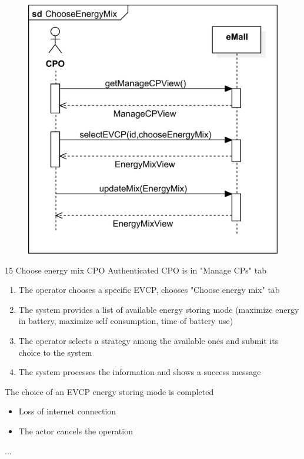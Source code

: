 \usecase
{
    \begin{figure}[H]
        \centering
        \includegraphics[scale=0.9]{src/sequence_diagram/chooseEnergyMix.png}
    \end{figure}
}
{15}
{Choose energy mix} %
{CPO} %
{Authenticated CPO is in "Manage CPs" tab} %
{ %
    \begin{enumerate}
        \item The operator chooses a specific EVCP, chooses "Choose energy mix" tab
        \item The system provides a list of available energy storing mode (maximize energy in battery, maximize self consumption, time of battery use)
        \item The operator selects a strategy among the available ones and submit its choice to the system
        \item The system processes the information and shows a success message
    \end{enumerate}
}
{The choice of an EVCP energy storing mode is completed} %
{ %
    \begin{itemize}
        \item Loss of internet connection
        \item The actor cancels the operation
    \end{itemize}
}
{ %
    ...
}


